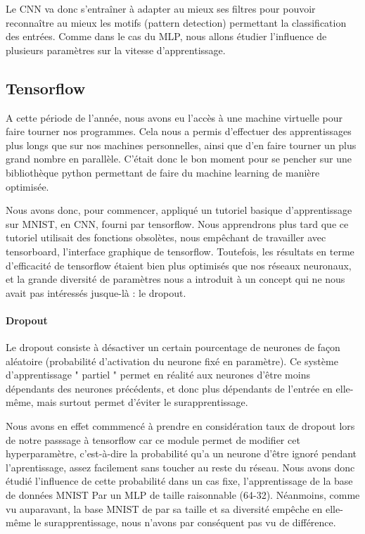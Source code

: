 \documentclass[
    10pt,
    a4paper,
    oneside,
    headinclude,footinclude,
    BCOR=5mm,
    captions=tableabove
]{scrartcl}
\begin{document}
Le CNN va donc s'entraîner à adapter au mieux ses filtres pour pouvoir reconnaître au mieux les motifs (pattern detection) permettant la classification des entrées. Comme dans le cas du MLP, nous allons étudier l'influence de plusieurs paramètres sur la vitesse d'apprentissage. 

\subsection{Tensorflow}

A cette période de l'année, nous avons eu l'accès à une machine virtuelle pour faire tourner nos programmes. Cela nous a permis d'effectuer des apprentissages plus longs que sur nos machines personnelles, ainsi que d'en faire tourner un plus grand nombre en parallèle. C'était donc le bon moment pour se pencher sur une bibliothèque python permettant de faire du machine learning de manière optimisée.

Nous avons donc, pour commencer, appliqué un tutoriel basique d'apprentissage sur MNIST, en CNN, fourni par tensorflow. Nous apprendrons plus tard que ce tutoriel utilisait des fonctions obsolètes, nous empêchant de travailler avec tensorboard, l'interface graphique de tensorflow. Toutefois, les résultats en terme d'efficacité de tensorflow étaient bien plus optimisés que nos réseaux neuronaux, et la grande diversité de paramètres nous a introduit à un concept qui ne nous avait pas intéressés jusque-là : le dropout.

\paragraph{Dropout}
Le dropout consiste à désactiver un certain pourcentage de neurones de façon aléatoire (probabilité d'activation du neurone fixé en paramètre). Ce système d'apprentissage " partiel " permet en réalité aux neurones d'être moins dépendants des neurones précédents, et donc plus dépendants de l'entrée en elle-même, mais surtout permet d'éviter le surapprentissage. 

Nous avons en effet commmencé à prendre en considération taux de dropout lors de notre passsage à tensorflow car ce module permet de modifier cet hyperparamètre, c'est-à-dire la probabilité qu'a un neurone d'être ignoré pendant l'aprentissage, assez facilement sans toucher au reste du réseau. Nous avons donc étudié l'influence de cette probabilité dans un cas fixe, l'apprentissage de la base de données MNIST Par un MLP de taille raisonnable (64-32).
Néanmoins, comme vu auparavant, la base MNIST de par sa taille et sa diversité empêche en elle-même le surapprentissage, nous n'avons par conséquent pas vu de différence. 
\end{document}

